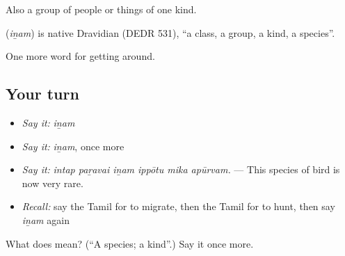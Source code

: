 Also a group of people or things of one kind.

\begin{cousinweb}
\textbf{} (\emph{iṉam}) is native Dravidian (DEDR 531), \textquotedblleft{}a class, a group, a kind, a species\textquotedblright{}.
\end{cousinweb}

\begin{grammarlens}[title={What you've built}]
One more word for getting around.
\end{grammarlens}

\subsection*{Your turn}
\begin{itemize}
\raggedright
  \item \emph{Say it:} \emph{iṉam}
  \item \emph{Say it:} \emph{iṉam}, once more
  \item \emph{Say it:} \emph{intap paṟavai iṉam ippōtu mika apūrvam.} — This species of bird is now very rare.
  \item \emph{Recall:} say the Tamil for to migrate, then the Tamil for to hunt, then say \emph{iṉam} again
\end{itemize}

\begin{tcolorbox}[breakable,colback=teal!4,colframe=teal!35!black,title={Before you move on}]
What does  mean? (\textquotedblleft{}A species; a kind\textquotedblright{}.) Say it once more.
\end{tcolorbox}
